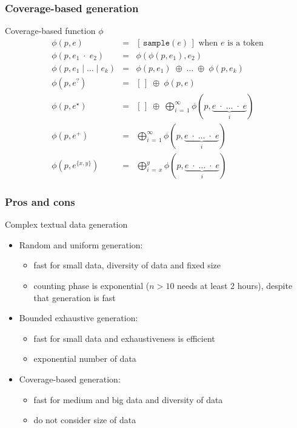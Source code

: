 \documentclass[9pt]{beamer}
\newcommand{\green}[1]{{\color{mygreen} #1}}
\newcommand{\code}[1]{\texttt{#1}}
\begin{document}
\begin{frame}
\frametitle{Coverage-based generation}

\begin{block}{Coverage-based function $\phi$}
\begin{eqnarray*}
\phi(p, e) & = & [\,\code{sample}(e)\,] \text{ \ \ when $e$ is a token} \\
\phi(p, e_1 \;\cdot\; e_2) & = & \phi(\phi(p, e_1),e_2) \\
\phi(p, e_1 \;\vert\; \ldots \;\vert\; e_k) & = & \phi(p,e_1) \;\oplus\; \ldots \;\oplus\; \phi(p,e_k) \\
\phi(p, e^?) & = & [\,] \;\oplus\; \phi(p,e) \\
\phi(p, e^\star) & = & [\,] \;\oplus\; \bigoplus_{i\,=\,1}^{\infty} \phi(p, \underbrace{e \;\cdot\; \dots \;\cdot\; e}_i)  \\
\phi(p, e^+) & = & \bigoplus_{i\,=\,1}^{\infty} \phi(p, \underbrace{e \;\cdot\; \dots \;\cdot\; e}_i)  \\
\phi(p, e^{\{x,y\}}) & = & \bigoplus_{i\,=\,x}^y \phi(p, \underbrace{e \;\cdot\; \dots \;\cdot\; e}_i)
\end{eqnarray*}
\end{block}

\end{frame}

\begin{frame}
\frametitle{Pros and cons}

\begin{block}{Complex textual data generation}
\begin{itemize}
\item Random and uniform generation:
  \begin{itemize}
  \item[\green \smiley] fast for small data, diversity of data and fixed size
  \item[\frownie] counting phase is exponential ($n > 10$ needs at least 2 hours),
  despite that generation is fast
  \end{itemize}
\item Bounded exhaustive generation:
  \begin{itemize}
  \item[\green \smiley] fast for small data and exhaustiveness is efficient
  \item[\frownie] exponential number of data
  \end{itemize}
\item Coverage-based generation:
  \begin{itemize}
  \item[\green \smiley] fast for medium and big data and diversity of data
  \item[\frownie] do not consider size of data
  \end{itemize}
\end{itemize}
\end{block}

\end{frame}
\end{document}
